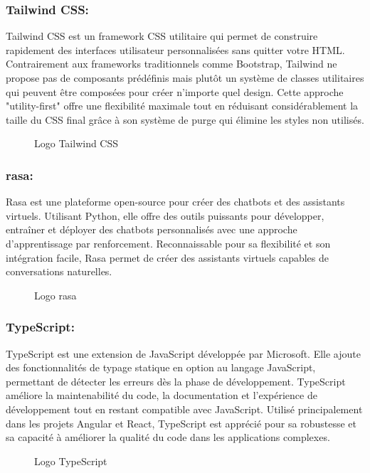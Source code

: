 \subsubsection*{Tailwind CSS:}
Tailwind\cite{b15} CSS est un framework CSS utilitaire qui permet de construire rapidement des interfaces utilisateur personnalisées sans quitter votre HTML. Contrairement aux frameworks traditionnels comme Bootstrap, Tailwind ne propose pas de composants prédéfinis mais plutôt un système de classes utilitaires qui peuvent être composées pour créer n'importe quel design. Cette approche "utility-first" offre une flexibilité maximale tout en réduisant considérablement la taille du CSS final grâce à son système de purge qui élimine les styles non utilisés.
\begin{figure}[H]
\centering
{}
\caption{Logo Tailwind CSS}
\end{figure}

\subsubsection*{rasa:}
Rasa \cite{b17}est une plateforme open-source pour créer des chatbots et des assistants virtuels. Utilisant Python, elle offre des outils puissants pour développer, entraîner et déployer des chatbots personnalisés avec une approche d'apprentissage par renforcement. Reconnaissable pour sa flexibilité et son intégration facile, Rasa permet de créer des assistants virtuels capables de conversations naturelles.
\begin{figure}[H]
\centering
{}
\caption{Logo rasa}
\end{figure}

\subsubsection*{TypeScript:}
TypeScript\cite{b18} est une extension de JavaScript\cite{b7} développée par Microsoft. Elle ajoute des fonctionnalités de typage statique en option au langage JavaScript, permettant de détecter les erreurs dès la phase de développement. TypeScript améliore la maintenabilité du code, la documentation et l'expérience de développement tout en restant compatible avec JavaScript. Utilisé principalement dans les projets Angular et React, TypeScript est apprécié pour sa robustesse et sa capacité à améliorer la qualité du code dans les applications complexes.
\begin{figure}[H]
\centering
{}
\caption{Logo TypeScript}
\end{figure}

